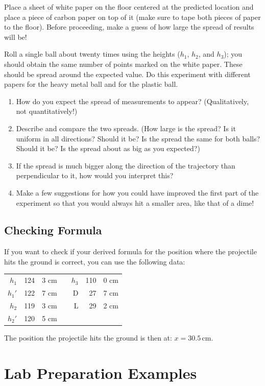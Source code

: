 Place a sheet of white paper on the floor centered at the predicted location and place a piece of carbon paper on top of it (make sure to tape both pieces of paper to the floor). Before proceeding, make a guess of how large the spread of results will be!\myskip

Roll a single ball about twenty times using the heights ($h_1$, $h_2$, and $h_3$); you should obtain the same number of points marked on the white paper. These should be spread around the expected value. Do this experiment with different papers for the heavy metal ball and for the plastic ball.
\begin{enumerate}
    \item How do you expect the spread of measurements to appear? (Qualitatively, not quantitatively!)
    \item Describe and compare the two spreads. (How large is the spread?  Is it uniform in all directions? Should it be?  Is the spread the same for both balls? Should it be? Is the spread about as big as you expected?)
    \item If the spread is much bigger along the direction of the trajectory than perpendicular to it, how would you interpret this?
    \item Make a few suggestions for how you could have improved the first part of the experiment so that you would always hit a smaller area, like that of a dime!
\end{enumerate}

\subsection{Checking Formula}
If you want to check if your derived formula for the position where the projectile hits the ground is correct, you can use the following data:
\begin{table}[h]
  \centering
  \begin{tabular}[h]{r@{=}r@{.}lcr@{=}r@{.}l}
    $h_{1}$&124&3 cm&&$h_{3}$&110&0 cm\\
    $h_{1}'$&122&7 cm&&D&27&7 cm\\
    $h_{2}$&119&3 cm&&L&29&2 cm\\
    $h_{2}'$&120&5 cm
  \end{tabular}
\end{table}
The position the projectile hits the ground is then at: $x  =  30.5\, \textrm{cm}$.

\section{Lab Preparation Examples}

